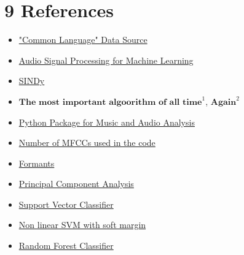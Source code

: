 \documentclass{article}
\begin{document}
\section*{9 \space References}
\begin{itemize}
    \item \href{https://huggingface.co/datasets/common_language}{"Common Language" Data Source}

    \item \href{https://www.youtube.com/playlist?list=PL-wATfeyAMNqIee7cH3q1bh4QJFAaeNv0}{Audio Signal Processing for Machine Learning}

    \item \href{https://www.youtube.com/playlist?list=PLkjmwL-pF6dzj5aSN2sa4ZNm92G9b4ca2}{SINDy}

    \item \href{https://youtu.be/nmgFG7PUHfo?si=emVgNvaE7BQpk3al}{$\textbf{The most important algoorithm of all time}^1$}, \href{https://bootcamp.uxdesign.cc/the-most-important-algorithm-of-all-time-9ff1659ff3ef}{$\textbf{Again}^2$}
    
    \item \href{https://librosa.org/doc/latest/index.html}{Python Package for Music and Audio Analysis}

    \item \href{https://ietresearch.onlinelibrary.wiley.com/doi/full/10.1049/tje2.12082#:~:text=All\%20performance\%20metrics\%20gave\%20the,studies\%20use\%20only\%2013\%20MFCCs}{Number of MFCCs used in the code}

    \item \href{https://corpus.eduhk.hk/english_pronunciation/index.php/2-2-formants-of-vowels/}{Formants}
    
    \item \href{https://scikit-learn.org/stable/modules/generated/sklearn.decomposition.PCA.html}{Principal Component Analysis}
    
    \item \href{https://scikit-learn.org/stable/modules/generated/sklearn.svm.SVC.html}{Support Vector Classifier}
    
    \item \href{https://scikit-learn.org/stable/modules/svm.html#svm-kernels}{Non linear SVM with soft margin}
    
    \item \href{https://scikit-learn.org/stable/modules/generated/sklearn.ensemble.RandomForestClassifier.html}{Random Forest Classifier}


\end{itemize}
\end{document}
